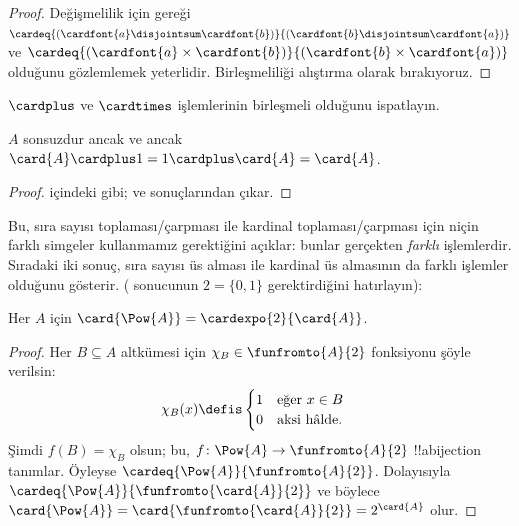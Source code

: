 \begin{proof}
Değişmelilik için
 gereği
$\cardeq{(\cardfont{a} \disjointsum
\cardfont{b})}{(\cardfont{b} \disjointsum \cardfont{a})}$ ve
$\cardeq{(\cardfont{a} \times \cardfont{b})}{(\cardfont{b} \times
\cardfont{a})}$ olduğunu gözlemlemek yeterlidir. Birleşmeliliği alıştırma
olarak bırakıyoruz.
\end{proof}

\begin{prob}
$\cardplus$ ve $\cardtimes$ işlemlerinin birleşmeli olduğunu ispatlayın.
\end{prob}

\begin{prop}
$A$ sonsuzdur ancak ve ancak
$\card{A} \cardplus 1 = 1 \cardplus \card{A} = \card{A}$.
\end{prop}

\begin{proof}
 içindeki gibi;
 ve
 sonuçlarından
çıkar.
\end{proof}

Bu, sıra sayısı toplaması/çarpması ile kardinal toplaması/çarpması için
niçin farklı simgeler kullanmamız gerektiğini açıklar: bunlar gerçekten
\emph{farklı} işlemlerdir. Sıradaki iki sonuç, sıra sayısı üs alması ile
kardinal üs almasının da farklı işlemler olduğunu gösterir.
( sonucunun $2=\{0,1\}$ gerektirdiğini
hatırlayın):

\begin{lem}
Her $A$ için $\card{\Pow{A}} = \cardexpo{2}{\card{A}}$.
\end{lem}

\begin{proof}
Her $B\subseteq A$ altkümesi için $\chi_B\in\funfromto{A}{2}$ fonksiyonu
şöyle verilsin:
\begin{align*}
	\chi_{B}(x) &\defis
	\begin{cases}
		1 & \text{eğer }x\in B\\
		0 & \text{aksi hâlde.}
	\end{cases}
\end{align*}
Şimdi $f(B)=\chi_B$ olsun; bu, $f\colon\Pow{A}\to
\funfromto{A}{2}$ !!a{bijection} tanımlar. Öyleyse
$\cardeq{\Pow{A}}{\funfromto{A}{2}}$. Dolayısıyla
$\cardeq{\Pow{A}}{\funfromto{\card{A}}{2}}$ ve böylece
$\card{\Pow{A}} = \card{\funfromto{\card{A}}{2}} =
2^{\card{A}}$ olur.
\end{proof}


